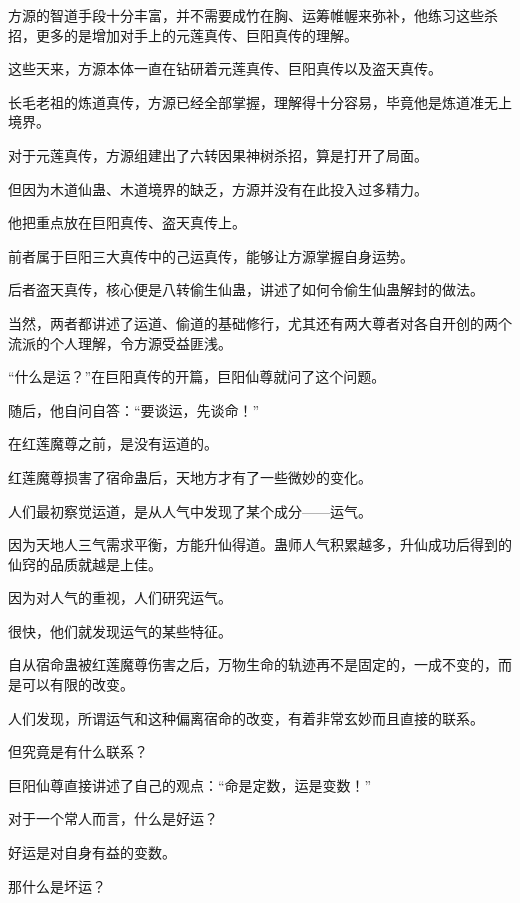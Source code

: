 
\begin{this_body}

方源的智道手段十分丰富，并不需要成竹在胸、运筹帷幄来弥补，他练习这些杀招，更多的是增加对手上的元莲真传、巨阳真传的理解。

这些天来，方源本体一直在钻研着元莲真传、巨阳真传以及盗天真传。

长毛老祖的炼道真传，方源已经全部掌握，理解得十分容易，毕竟他是炼道准无上境界。

对于元莲真传，方源组建出了六转因果神树杀招，算是打开了局面。

但因为木道仙蛊、木道境界的缺乏，方源并没有在此投入过多精力。

他把重点放在巨阳真传、盗天真传上。

前者属于巨阳三大真传中的己运真传，能够让方源掌握自身运势。

后者盗天真传，核心便是八转偷生仙蛊，讲述了如何令偷生仙蛊解封的做法。

当然，两者都讲述了运道、偷道的基础修行，尤其还有两大尊者对各自开创的两个流派的个人理解，令方源受益匪浅。

“什么是运？”在巨阳真传的开篇，巨阳仙尊就问了这个问题。

随后，他自问自答：“要谈运，先谈命！”

在红莲魔尊之前，是没有运道的。

红莲魔尊损害了宿命蛊后，天地方才有了一些微妙的变化。

人们最初察觉运道，是从人气中发现了某个成分——运气。

因为天地人三气需求平衡，方能升仙得道。蛊师人气积累越多，升仙成功后得到的仙窍的品质就越是上佳。

因为对人气的重视，人们研究运气。

很快，他们就发现运气的某些特征。

自从宿命蛊被红莲魔尊伤害之后，万物生命的轨迹再不是固定的，一成不变的，而是可以有限的改变。

人们发现，所谓运气和这种偏离宿命的改变，有着非常玄妙而且直接的联系。

但究竟是有什么联系？

巨阳仙尊直接讲述了自己的观点：“命是定数，运是变数！”

对于一个常人而言，什么是好运？

好运是对自身有益的变数。

那什么是坏运？


\end{this_body}
